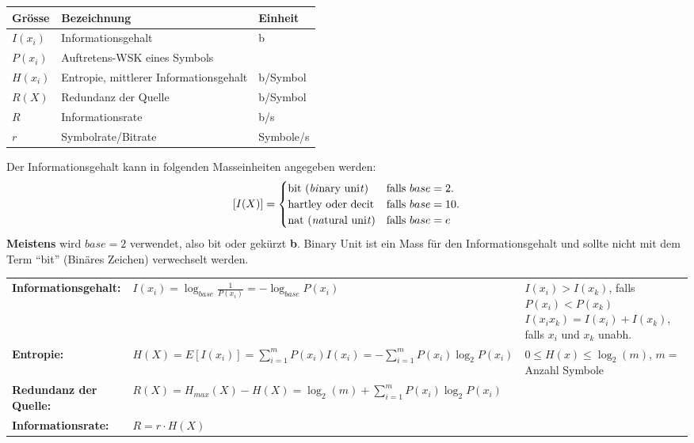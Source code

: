 \begin{multicols}{2}
\renewcommand{\arraystretch}{\arraystretchOriginal}
\begin{tabular}{|l|l|l|}
	\hline
	\textbf{Grösse}	& \textbf{Bezeichnung}	& \textbf{Einheit} \\ 
	\hline
	$I(x_i)$ 	& Informationsgehalt 	& b \\
	\hline
	$P(x_i)$	& Auftretens-WSK eines Symbols & \\
	\hline
	$H(x_i)$	& Entropie, mittlerer Informationsgehalt				& b/Symbol\\
	\hline
	$R(X)$		& Redundanz der Quelle			& b/Symbol \\
	\hline
	$R$			& Informationsrate 		& b/s \\
	\hline
	$r$			& Symbolrate/Bitrate	& Symbole/s	 \\
	\hline
\end{tabular}

Der Informationsgehalt kann in folgenden Masseinheiten angegeben werden:
\[ [I(X)] = \begin{cases}
            	\text{bit (\emph{bi}nary uni\emph{t})} 
            		& \text{falls } base=2. \\
            	\text{hartley oder decit}
            		& \text{falls } base=10. \\
            	\text{nat (\emph{na}tural uni\emph{t})} 
            		& \text{falls } base=e
			\end{cases} 
\]
\textbf{Meistens} wird $base=2$ verwendet, also bit oder gekürzt
\textbf{b}. Binary Unit ist ein Mass für den Informationsgehalt und sollte nicht mit dem Term ``bit'' (Binäres Zeichen) verwechselt
werden.
\end{multicols}
\begin{tabular}{l l l}


  	\textbf{Informationsgehalt:}
  	& $I(x_i) =  \log_{base} \frac{1}{P(x_i)} = - \log_{base} P(x_i)$
  	& \parbox[c]{10cm}{
  		$I(x_i) > I(x_k)$, falls $P(x_i) < 	P(x_k)$ \\
  		$I(x_i x_k) = I(x_i) + I(x_k)$, falls $x_i$ und $x_k$ unabh.
  	} \\
  
  	\textbf{Entropie:}
  	& $H(X)	= E[I(x_i)] = \sum\limits_{i=1}^m P(x_i) I(x_i) = - \sum\limits_{i=1}^m  P(x_i) \log_2{P(x_i)} $
  	& $ 0 \leq H(x) \leq \log_2(m)$, $m =$ Anzahl Symbole \\

	\textbf{Redundanz der Quelle:} 
	& $R(X) = H_{max}(X) - H(X) = \log_2(m) + \sum\limits_{i=1}^m  P(x_i) \log_2{P(x_i)}$ \\
	
	\textbf{Informationsrate:} 
	& $R = r \cdot H(X)$ \\
	
\end{tabular}

